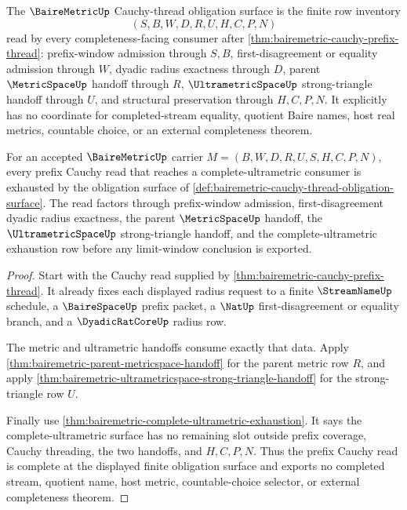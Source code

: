 \begin{definition}
\label{def:bairemetric-cauchy-thread-obligation-surface}
The $\BaireMetricUp$ Cauchy-thread obligation surface is the finite row inventory
$$
(S,B,W,D,R,U,H,C,P,N)
$$
read by every completeness-facing consumer after \autoref{thm:bairemetric-cauchy-prefix-thread}: prefix-window admission through $S,B$, first-disagreement or equality admission through $W$, dyadic radius exactness through $D$, parent $\MetricSpaceUp$ handoff through $R$, $\UltrametricSpaceUp$ strong-triangle handoff through $U$, and structural preservation through $H,C,P,N$. It explicitly has no coordinate for completed-stream equality, quotient Baire names, host real metrics, countable choice, or an external completeness theorem.
\end{definition}

\begin{theorem}
\label{thm:bairemetric-prefix-cauchy-thread-completeness}
For an accepted $\BaireMetricUp$ carrier $M=(B,W,D,R,U,S,H,C,P,N)$, every prefix Cauchy read that reaches a complete-ultrametric consumer is exhausted by the obligation surface of \autoref{def:bairemetric-cauchy-thread-obligation-surface}. The read factors through prefix-window admission, first-disagreement dyadic radius exactness, the parent $\MetricSpaceUp$ handoff, the $\UltrametricSpaceUp$ strong-triangle handoff, and the complete-ultrametric exhaustion row before any limit-window conclusion is exported.
\end{theorem}
\begin{proof}
Start with the Cauchy read supplied by \autoref{thm:bairemetric-cauchy-prefix-thread}. It already fixes each displayed radius request to a finite $\StreamNameUp$ schedule, a $\BaireSpaceUp$ prefix packet, a $\NatUp$ first-disagreement or equality branch, and a $\DyadicRatCoreUp$ radius row.

The metric and ultrametric handoffs consume exactly that data. Apply \autoref{thm:bairemetric-parent-metricspace-handoff} for the parent metric row $R$, and apply \autoref{thm:bairemetric-ultrametricspace-strong-triangle-handoff} for the strong-triangle row $U$.

Finally use \autoref{thm:bairemetric-complete-ultrametric-exhaustion}. It says the complete-ultrametric surface has no remaining slot outside prefix coverage, Cauchy threading, the two handoffs, and $H,C,P,N$. Thus the prefix Cauchy read is complete at the displayed finite obligation surface and exports no completed stream, quotient name, host metric, countable-choice selector, or external completeness theorem.
\end{proof}

